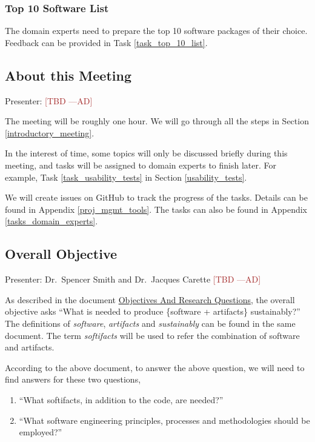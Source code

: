\documentclass[12pt]{article}
\newcommand{\authornote}[3]{\textcolor{#1}{[#3 ---#2]}}
\newcommand{\authornote}[3]{}
\newcommand{\ad}[1]{\authornote{brown}{AD}{#1}} %
\begin{document}
\subsubsection{Top 10 Software List}
\label{top_10_list}

The domain experts need to prepare the top 10 software packages of their choice.
Feedback can be provided in Task \ref{task_top_10_list}.

\subsection{About this Meeting}
Presenter: \ad{TBD}

The meeting will be roughly one hour. We will go
through all the steps in Section \ref{introductory_meeting}.

In the interest of time, some topics will only be discussed briefly during this
meeting, and tasks will be assigned to domain experts to finish later. For
example, Task \ref{task_usability_tests} in Section \ref{usability_tests}.

We will create issues on GitHub to track the progress of the tasks. Details can
be found in Appendix \ref{proj_mgmt_tools}. The tasks can also be found in
Appendix \ref{tasks_domain_experts}.

\subsection{Overall Objective}
\label{overall_objective}
Presenter: Dr.\ Spencer Smith and Dr.\ Jacques Carette \ad{TBD}

As described in the document 
\href{https://github.com/smiths/AIMSS/blob/master/OverallResearchProposal/ObjectivesAndResearchQuestions.pdf}{Objectives
And Research Questions}, the overall objective asks ``What is needed to produce
\{software + artifacts\} sustainably?'' The definitions of \emph{software},
\emph{artifacts} and \emph{sustainably} can be found in the same document. The
term \emph{softifacts} will be used to refer the combination of software and
artifacts.

According to the above document, to answer the above question, we will need to
find answers for these two questions,
\begin{enumerate}
\item ``What softifacts, in addition to the code, are needed?''
\item ``What software engineering principles, processes and methodologies should
be employed?''
\end{enumerate}
\end{document}
